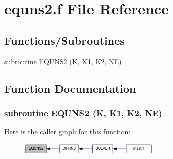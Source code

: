 \hypertarget{equns2_8f}{
\section{equns2.f File Reference}
\label{equns2_8f}
}
\subsection*{Functions/Subroutines}
\begin{DoxyCompactItemize}
\item 
subroutine \hyperlink{equns2_8f_a71cacdd7e6393cbcba327d5eb902ff01}{EQUNS2} (K, K1, K2, NE)
\end{DoxyCompactItemize}


\subsection{Function Documentation}
\hypertarget{equns2_8f_a71cacdd7e6393cbcba327d5eb902ff01}{
\subsubsection[{EQUNS2}]{\setlength{\rightskip}{0pt plus 5cm}subroutine EQUNS2 (K, \/  K1, \/  K2, \/  NE)}}
\label{equns2_8f_a71cacdd7e6393cbcba327d5eb902ff01}


Here is the caller graph for this function:\nopagebreak
\begin{figure}[H]
\begin{center}
\leavevmode
\includegraphics[width=192pt]{equns2_8f_a71cacdd7e6393cbcba327d5eb902ff01_icgraph}
\end{center}
\end{figure}
